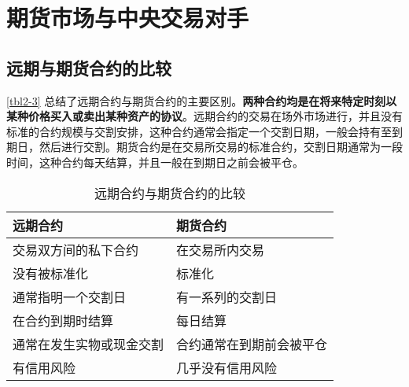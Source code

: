 \chapter{期货市场与中央交易对手}
\section{远期与期货合约的比较}
\autoref{tbl2-3} 总结了远期合约与期货合约的主要区别。\textbf{两种合约均是在将来特定时刻以某种价格买入或卖出某种资产的协议}。远期合约的交易在场外市场进行，并且没有标准的合约规模与交割安排，这种合约通常会指定一个交割日期，一般会持有至到期日，然后进行交割。期货合约是在交易所交易的标准合约，交割日期通常为一段时间，这种合约每天结算，并且一般在到期日之前会被平仓。

\begin{table}
    \centering
    \caption{远期合约与期货合约的比较}
    \label{tbl2-3}
    \begin{tabular}{ll}
        \hline
        远期合约         & 期货合约         \\
        \hline
        交易双方间的私下合约   & 在交易所内交易      \\
        没有被标准化       & 标准化          \\
        通常指明一个交割日    & 有一系列的交割日     \\
        在合约到期时结算     & 每日结算         \\
        通常在发生实物或现金交割 & 合约通常在到期前会被平仓 \\
        有信用风险        & 几乎没有信用风险     \\
        \hline
    \end{tabular}
\end{table}